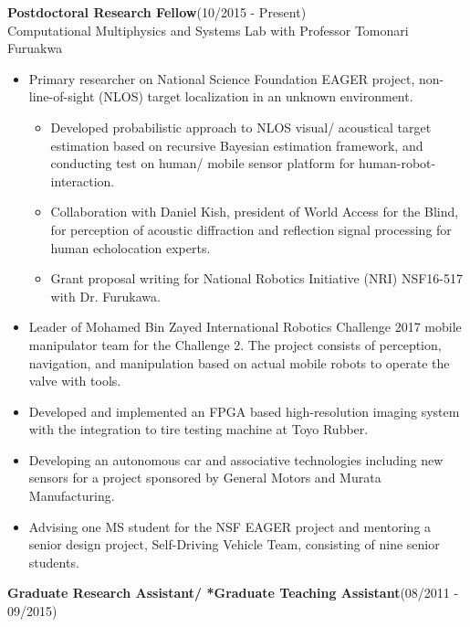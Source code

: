 \documentclass[11pt,letterpaper]{article}
\begin{document}
{\bfseries Postdoctoral Research Fellow}\hfill {(10/2015 - Present)}\\
Computational Multiphysics and Systems Lab with Professor Tomonari Furuakwa\\
\begin{itemize}
	\item Primary researcher on National Science Foundation EAGER project, non-line-of-sight (NLOS) target localization in an unknown environment.
	\begin{itemize}
		\item Developed probabilistic approach to NLOS visual/ acoustical target estimation based on recursive Bayesian estimation framework, and conducting test on human/ mobile sensor platform for human-robot-interaction.
		\item Collaboration with Daniel Kish, president of World Access for the Blind, for perception of acoustic diffraction and reflection signal processing for human echolocation experts.
		\item Grant proposal writing for National Robotics Initiative (NRI) NSF16-517 with Dr. Furukawa.
	\end{itemize}
	\item Leader of Mohamed Bin Zayed International Robotics Challenge 2017 mobile manipulator team for the Challenge 2. The project consists of perception, navigation, and manipulation based on actual mobile robots to operate the valve with tools.
	\item Developed and implemented an FPGA based high-resolution imaging system with the integration to tire testing machine at Toyo Rubber.
	\item Developing an autonomous car and associative technologies including new sensors for a project sponsored by General Motors and Murata Manufacturing. \item Advising one MS student for the NSF EAGER project and mentoring a senior design project, Self-Driving Vehicle Team, consisting of nine senior students.  
\end{itemize}
{\bfseries Graduate Research Assistant/ *Graduate Teaching Assistant}\hfill {(08/2011 - 09/2015)}\\
\end{document}

